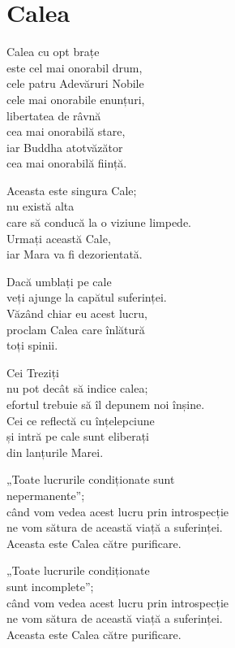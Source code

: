 
\chapter{Calea}


Calea cu opt brațe\\
este cel mai onorabil drum,\\
cele patru Adevăruri Nobile\\
cele mai onorabile enunțuri,\\
libertatea de râvnă\\
cea mai onorabilă stare,\\
iar Buddha atotvăzător\\
cea mai onorabilă ființă.


Aceasta este singura Cale;\\
nu există alta\\
care să conducă la o viziune limpede.\\
Urmați această Cale,\\
iar Mara va fi dezorientată.


Dacă umblați pe cale\\
veți ajunge la capătul suferinței.\\
Văzând chiar eu acest lucru,\\
proclam Calea care înlătură\\
toți spinii.


Cei Treziți\\
nu pot decât să indice calea;\\
efortul trebuie să îl depunem noi înșine.\\
Cei ce reflectă cu înțelepciune\\
și intră pe cale sunt eliberați\\
din lanțurile Marei.


„Toate lucrurile condiționate sunt\\
nepermanente”;\\
când vom vedea acest lucru prin introspecție\\
ne vom sătura de această viață a suferinței.\\
Aceasta este Calea către purificare.


„Toate lucrurile condiționate\\
sunt incomplete”;\\
când vom vedea acest lucru prin introspecție\\
ne vom sătura de această viață a suferinței.\\
Aceasta este Calea către purificare.


